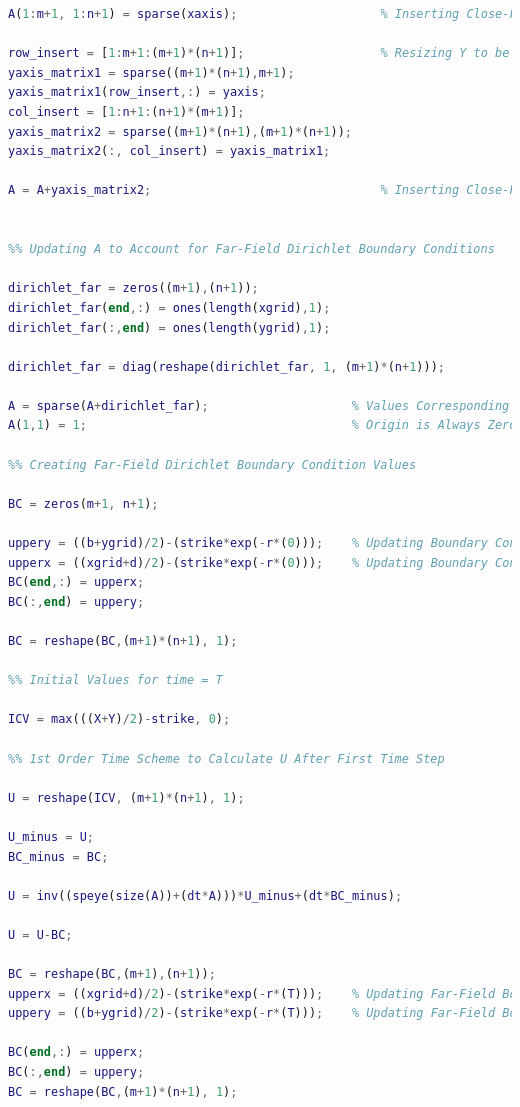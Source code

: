 \documentclass[12pt,letterpaper]{article}
\begin{document}
\begin{lstlisting}[language = Matlab]
A(1:m+1, 1:n+1) = sparse(xaxis);                    % Inserting Close-Field Boundary Condition for X-Axis into A

row_insert = [1:m+1:(m+1)*(n+1)];                   % Resizing Y to be Inserted Into A Matrix
yaxis_matrix1 = sparse((m+1)*(n+1),m+1);
yaxis_matrix1(row_insert,:) = yaxis;
col_insert = [1:n+1:(n+1)*(m+1)];
yaxis_matrix2 = sparse((m+1)*(n+1),(m+1)*(n+1));
yaxis_matrix2(:, col_insert) = yaxis_matrix1;

A = A+yaxis_matrix2;                                % Inserting Close-Field Boundary Condition for Y-Axis into A


%% Updating A to Account for Far-Field Dirichlet Boundary Conditions

dirichlet_far = zeros((m+1),(n+1));
dirichlet_far(end,:) = ones(length(xgrid),1);
dirichlet_far(:,end) = ones(length(ygrid),1);

dirichlet_far = diag(reshape(dirichlet_far, 1, (m+1)*(n+1)));

A = sparse(A+dirichlet_far);                    % Values Corresponding to Far-Field Boundary in A Are One on Diagonal
A(1,1) = 1;                                     % Origin is Always Zero

%% Creating Far-Field Dirichlet Boundary Condition Values

BC = zeros(m+1, n+1);

uppery = ((b+ygrid)/2)-(strike*exp(-r*(0)));    % Updating Boundary Conditions
upperx = ((xgrid+d)/2)-(strike*exp(-r*(0)));    % Updating Boundary Conditions
BC(end,:) = upperx;
BC(:,end) = uppery;

BC = reshape(BC,(m+1)*(n+1), 1);

%% Initial Values for time = T

ICV = max(((X+Y)/2)-strike, 0);

%% 1st Order Time Scheme to Calculate U After First Time Step

U = reshape(ICV, (m+1)*(n+1), 1);

U_minus = U;
BC_minus = BC;

U = inv((speye(size(A))+(dt*A)))*U_minus+(dt*BC_minus);

U = U-BC;

BC = reshape(BC,(m+1),(n+1));
upperx = ((xgrid+d)/2)-(strike*exp(-r*(T)));    % Updating Far-Field Boundary Conditions for X
uppery = ((b+ygrid)/2)-(strike*exp(-r*(T)));    % Updating Far-Field Boundary Conditions for Y

BC(end,:) = upperx;
BC(:,end) = uppery;
BC = reshape(BC,(m+1)*(n+1), 1);


\end{lstlisting}
\end{document}
